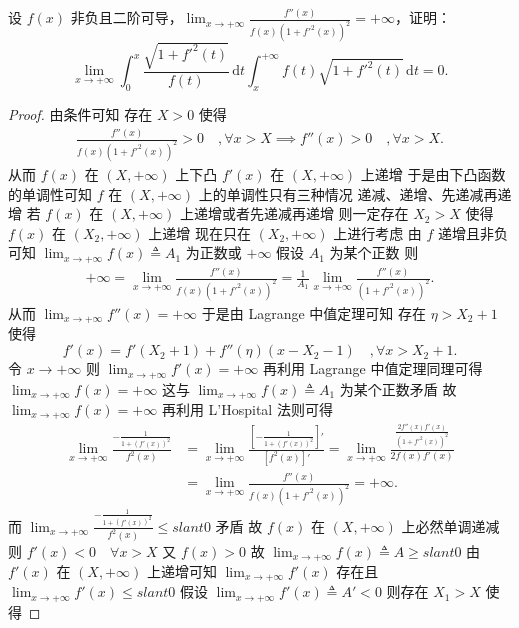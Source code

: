 \documentclass[../../main.tex]{subfiles}
\begin{document}
\vspace{0.5cm}

\begin{example}
设 \( f(x) \) 非负且二阶可导，\( \lim_{x \to +\infty} \frac{f''(x)}{f(x)(1 + f'^2(x))^2} = +\infty \)，证明：
\[
\lim_{x \to +\infty} \int_0^x \frac{\sqrt{1 + f'^2(t)}}{f(t)} \, \mathrm{d}t \int_x^{+\infty} f(t) \sqrt{1 + f'^2(t)} \, \mathrm{d}t = 0.
\] 
\end{example}
\begin{proof}
由条件可知 存在 \( X > 0 \) 使得
\begin{align*}
\frac{f''(x)}{f(x)(1 + f'^2(x))^2} > 0 \quad ,\forall x > X \implies f''(x) > 0 \quad ,\forall x > X.
\end{align*}
从而 \( f(x) \) 在 \( (X, +\infty) \) 上下凸 \( f'(x) \) 在 \( (X, +\infty) \) 上递增 于是由下凸函数的单调性可知 \( f \) 在 \( (X, +\infty) \) 上的单调性只有三种情况 递减、递增、先递减再递增 若 \( f(x) \) 在 \( (X, +\infty) \) 上递增或者先递减再递增 则一定存在 \( X_2 > X \) 使得 \( f(x) \) 在 \( (X_2, +\infty) \) 上递增 现在只在 \( (X_2, +\infty) \) 上进行考虑 由 \( f \) 递增且非负可知 \( \lim_{x \to +\infty} f(x) \triangleq A_1 \) 为正数或 \( +\infty \) 假设 \( A_1 \) 为某个正数 则
\begin{align*}
+\infty = \lim_{x \to +\infty} \frac{f''(x)}{f(x)(1 + f'^2(x))^2} = \frac{1}{A_1} \lim_{x \to +\infty} \frac{f''(x)}{(1 + f'^2(x))^2}.
\end{align*}
从而 \( \lim_{x \to +\infty} f''(x) = +\infty \) 于是由 Lagrange 中值定理可知 存在 \( \eta > X_2 + 1 \) 使得
\[
f'(x) = f'(X_2 + 1) + f''(\eta)(x - X_2 - 1) \quad, \forall x > X_2 + 1.
\]
令 \( x \to +\infty \) 则 \( \lim_{x \to +\infty} f'(x) = +\infty \) 再利用 Lagrange 中值定理同理可得 \( \lim_{x \to +\infty} f(x) = +\infty \) 这与 \( \lim_{x \to +\infty} f(x) \triangleq A_1 \) 为某个正数矛盾 故 \( \lim_{x \to +\infty} f(x) = +\infty \) 再利用 L’Hospital 法则可得
\begin{align*}
\lim_{x \to +\infty} \frac{-\frac{1}{1 + (f'(x))^2}}{f^2(x)} &= \lim_{x \to +\infty} \frac{\left[ -\frac{1}{1 + (f'(x))^2} \right]'}{\left[ f^2(x) \right]'} = \lim_{x \to +\infty} \frac{\frac{2f''(x)f'(x)}{(1 + f'^2(x))^2}}{2f(x)f'(x)} \\
&= \lim_{x \to +\infty} \frac{f''(x)}{f(x)(1 + f'^2(x))^2} = +\infty.
\end{align*}
而 \( \lim_{x \to +\infty} \frac{-\frac{1}{1 + (f'(x))^2}}{f^2(x)} \leqslant slant 0 \) 矛盾 故 \( f(x) \) 在 \( (X, +\infty) \) 上必然单调递减 则 \( f'(x) < 0 \quad \forall x > X \) 又 \( f(x) > 0 \) 故 \( \lim_{x \to +\infty} f(x) \triangleq A \geqslant slant 0 \) 由 \( f'(x) \) 在 \( (X, +\infty) \) 上递增可知 \( \lim_{x \to +\infty} f'(x) \) 存在且 \( \lim_{x \to +\infty} f'(x) \leqslant slant 0 \) 假设 \( \lim_{x \to +\infty} f'(x) \triangleq A' < 0 \) 则存在 \( X_1 > X \) 使得

\end{proof}
\end{document}
